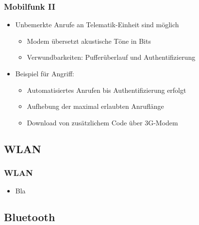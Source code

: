 \documentclass[t]{beamer}
\begin{document}
\begin{frame}
	\frametitle{Mobilfunk II}
    \begin{itemize}
		\item Unbemerkte Anrufe an Telematik-Einheit sind möglich
        \begin{itemize}
        	\item Modem übersetzt akustische Töne in Bits
            \item Verwundbarkeiten: Pufferüberlauf und Authentifizierung
        \end{itemize}

        \item Beispiel für Angriff:
        \begin{itemize}
        	\item Automatisiertes Anrufen bis Authentifizierung erfolgt
            \item Aufhebung der maximal erlaubten Anruflänge
            \item Download von zusätzlichem Code über 3G-Modem
        \end{itemize}
    \end{itemize}
\end{frame}


 \subsection{WLAN} %
 \begin{frame}
	\frametitle{WLAN}
    \begin{itemize}
		\item Bla
    \end{itemize}
\end{frame}
 \subsection{Bluetooth} %
\end{document}
